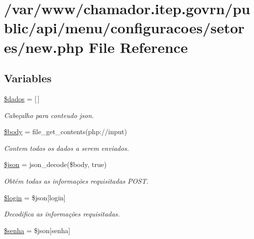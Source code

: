 \hypertarget{menu_2configuracoes_2setores_2new_8php}{}\section{/var/www/chamador.itep.\+govrn/public/api/menu/configuracoes/setores/new.php File Reference}
\label{menu_2configuracoes_2setores_2new_8php}
\subsection*{Variables}
\begin{DoxyCompactItemize}
\item 
\hyperlink{menu_2configuracoes_2setores_2new_8php_a252370d95039a38fa11afab784725d58}{\$dados} = \mbox{[}$\,$\mbox{]}
\begin{DoxyCompactList}\small\item\em Cabeçalho para conteudo json. \end{DoxyCompactList}\item 
\hyperlink{menu_2configuracoes_2setores_2new_8php_a26b9f9373f7bb79dfcf8a86dff086b45}{\$body} = file\+\_\+get\+\_\+contents(\textquotesingle{}php\+://input\textquotesingle{})
\begin{DoxyCompactList}\small\item\em Contem todos os dados a serem enviados. \end{DoxyCompactList}\item 
\hyperlink{menu_2configuracoes_2setores_2new_8php_acedd13b51401130848ce18f4d5c52605}{\$json} = json\+\_\+decode(\$body, true)
\begin{DoxyCompactList}\small\item\em Obtém todas as informações requisitadas P\+O\+ST. \end{DoxyCompactList}\item 
\hyperlink{menu_2configuracoes_2setores_2new_8php_afc31993e855f9631572adfedcfe6f34b}{\$login} = \$json\mbox{[}\textquotesingle{}login\textquotesingle{}\mbox{]}
\begin{DoxyCompactList}\small\item\em Decodifica as informações requisitadas. \end{DoxyCompactList}\item 
\hyperlink{menu_2configuracoes_2setores_2new_8php_a3678c8769c9698fd30581c1016c5f475}{\$senha} = \$json\mbox{[}\textquotesingle{}senha\textquotesingle{}\mbox{]}

\end{DoxyCompactItemize}
